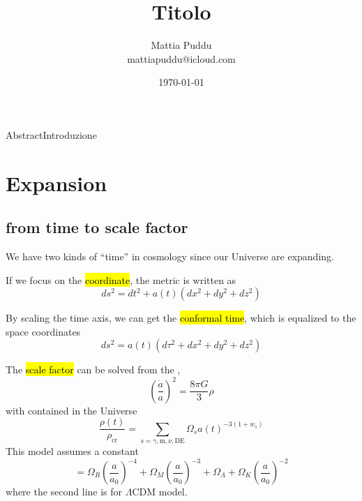 \documentclass[10pt, a4paper, lualatex]{article}
\begin{document}
\title{Titolo}
\author{Mattia Puddu\\mattiapuddu@icloud.com}
\date{\today}
\maketitle
\begin{TitoloIntro}[colbacktitle=red]{\large Abstract}{Introduzione}\end{TitoloIntro}

\section{Expansion}

\subsection{from time to scale factor}

We have two kinds of ``time'' in cosmology since our Universe are expanding. 

If we focus on the \hl{coordinate}, the metric is written as 
\begin{equation}
    d s^2 = dt^2 + a(t) \left(dx^2 + dy^2 + dz^2\right)
\end{equation}

By scaling the time axis, we can get the \hl{conformal time}, which is equalized to the space coordinates
\begin{equation}
    d s^2 = a(t) \left(d\tau^2 + dx^2 + dy^2 + dz^2\right)
\end{equation}

The \hl{scale factor} can be solved from the , 
\begin{equation}
    \left(\frac{\dot{a}}{a}\right)^2 = \frac{8\pi G}{3} \rho
\end{equation}
with  contained in the Universe 
\begin{equation}
    \frac{\rho(t)}{\rho_{\mathrm{cr}}} = \sum_{s=\gamma, \mathrm{m}, \nu, \mathrm{DE}} \Omega_{s} a(t) ^{-3 (1 + w_{s})} 
\end{equation}
This model assumes a constant 
\begin{equation}
    = \Omega_R \left(\frac{a}{a_0}\right)^{-4} + \Omega_M \left(\frac{a}{a_0}\right)^{-3} + \Omega_\Lambda + \Omega_K \left(\frac{a}{a_0}\right)^{ -2}
\end{equation}
where the second line is for $\Lambda$CDM model.

\end{document}

